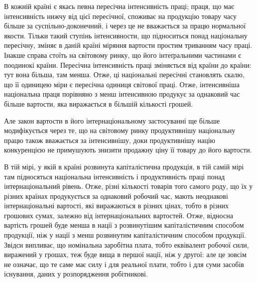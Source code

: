 
В кожній країні є якась певна пересічна інтенсивність праці;
праця, що має інтенсивність нижчу від цієї пересічної, споживає
на продукцію товару часу більше за суспільно-доконечний,
і через це не вважається за працю нормальної якости. Тільки
такий ступінь інтенсивности, що підноситься понад національну
пересічну, зміняє в даній країні міряння вартости простим триванням
часу праці. Інакше справа стоїть на світовому ринку,
що його інтеґральними частинами є поодинокі країни. Пересічна
інтенсивність праці зміняється від країни до країни: тут вона
більша, там менша. Отже, ці національні пересічні становлять
скалю, що її одиницею міри є пересічна одиниця світової праці.
Отже, інтенсивніша національна праця порівняно з менш інтенсивною
продукує за однаковий час більше вартости, яка виражається
в більшій кількості грошей.

Але закон вартости в його інтернаціональному застосуванні
ще більше модифікується через те, що на світовому ринку продуктивнішу
національну працю також вважається за інтенсивнішу,
доки продуктивнішу націю конкуренцією не примушують
знизити продажну ціну її товару до його вартости.

В тій мірі, у якій в країні розвинута капіталістична продукція,
в тій самій мірі там підносяться національна інтенсивність і
продуктивність праці понад інтернаціональний рівень. Отже,
різні кількості товарів того самого роду, що їх у різних країнах
продукується за однаковий робочий час, мають неоднакові інтернаціональні
вартості, які виражаються в різних цінах, тобто
в різних грошових сумах, залежно від інтернаціональних вартостей.
Отже, відносна вартість грошей буде менша в нації з
розвинутішим капіталістичним способом продукції, ніж у нації
з менш розвинутим капіталістичним способом продукції. Звідси
випливає, що номінальна заробітна плата, тобто еквівалент робочої
сили, виражений у грошах, теж буде вища в першої нації,
ніж у другої: але це зовсім не означає, що те саме має силу і
для реальної плати, тобто і для суми засобів існування, даних
у розпорядження робітникові.

